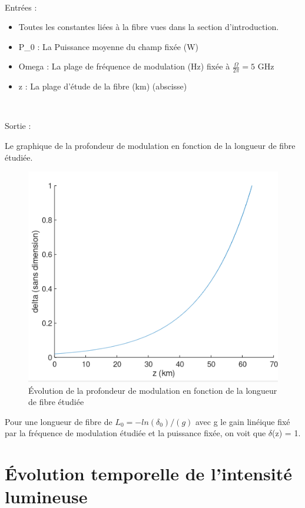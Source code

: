 \documentclass[a4paper,12pt,titlepage]{article}
\begin{document}
             ~
             
             Entrées :
             \begin{itemize}
                 \item Toutes les constantes liées à la fibre vues dans la section d'introduction.
                 \item P\_0 : La Puissance moyenne du champ fixée (W)
                 \item Omega : La plage de fréquence de modulation (Hz) fixée à $\frac{\Omega}{2\pi} = 5 $ GHz
                 \item z : La plage d'étude de la fibre (km) (abscisse)
                 
             \end{itemize}
             
             ~
             
             Sortie :
             
            Le graphique de la profondeur de modulation en fonction de la longueur de fibre étudiée.
    
        \begin{figure}[h!]
            \centering
            \includegraphics{delta(z)}
            \caption{Évolution de la profondeur de modulation en fonction de la longueur de fibre étudiée}
            \label{delta}
        \end{figure}
        
        Pour une longueur de fibre de $L_0 = -ln(\delta_0)/(g)$ avec g le gain linéique fixé par la fréquence de modulation étudiée et la puissance fixée, on voit que $\delta$(z) = 1.
        
    \newpage
    
    \section{Évolution temporelle de l'intensité lumineuse}
        
        
    
\end{document}
